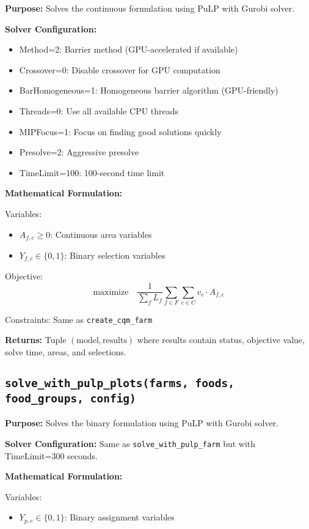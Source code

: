 \documentclass{article}
\begin{document}
\textbf{Purpose:} Solves the continuous formulation using PuLP with Gurobi solver.

\textbf{Solver Configuration:}
\begin{itemize}
    \item Method=2: Barrier method (GPU-accelerated if available)
    \item Crossover=0: Disable crossover for GPU computation
    \item BarHomogeneous=1: Homogeneous barrier algorithm (GPU-friendly)
    \item Threads=0: Use all available CPU threads
    \item MIPFocus=1: Focus on finding good solutions quickly
    \item Presolve=2: Aggressive presolve
    \item TimeLimit=100: 100-second time limit
\end{itemize}

\textbf{Mathematical Formulation:}

Variables:
\begin{itemize}
    \item $A_{f,c} \geq 0$: Continuous area variables
    \item $Y_{f,c} \in \{0,1\}$: Binary selection variables
\end{itemize}

Objective:
$$\text{maximize} \quad \frac{1}{\sum_f L_f} \sum_{f \in F} \sum_{c \in C} v_c \cdot A_{f,c}$$

Constraints: Same as \texttt{create\_cqm\_farm}

\textbf{Returns:} Tuple $(\text{model}, \text{results})$ where results contain status, objective value, solve time, areas, and selections.

\subsection{\texttt{solve\_with\_pulp\_plots(farms, foods, food\_groups, config)}}

\textbf{Purpose:} Solves the binary formulation using PuLP with Gurobi solver.

\textbf{Solver Configuration:} Same as \texttt{solve\_with\_pulp\_farm} but with TimeLimit=300 seconds.

\textbf{Mathematical Formulation:}

Variables:
\begin{itemize}
    \item $Y_{p,c} \in \{0,1\}$: Binary assignment variables
\end{itemize}
\end{document}
